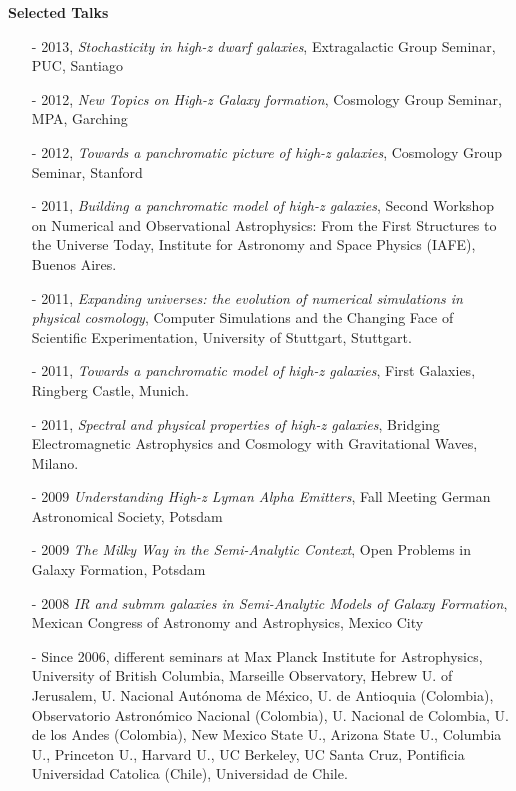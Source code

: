 \documentclass[9pt]{article}
\begin{document}
{\bf Selected Talks}
\begin{itemize} 
\item [-] 2013, {\it Stochasticity in high-z dwarf galaxies},
  Extragalactic Group Seminar, PUC, Santiago
\item [-] 2012, {\it New Topics on High-z Galaxy formation}, Cosmology
  Group Seminar, MPA, Garching 
\item [-] 2012, {\it Towards a panchromatic picture of high-z
  galaxies}, Cosmology Group Seminar, Stanford 
\item [-] 2011, {\it Building a panchromatic model of high-z
  galaxies}, Second Workshop on Numerical and Observational
  Astrophysics: From the First Structures to the Universe Today,
  Institute for Astronomy and Space Physics (IAFE), Buenos Aires. 
\item [-] 2011, {\it Expanding universes: the evolution of numerical
  simulations in physical cosmology}, Computer Simulations and the
  Changing Face of Scientific Experimentation, University of
  Stuttgart, Stuttgart. 
\item [-] 2011, {\it Towards a panchromatic model of high-z galaxies}, First
  Galaxies, Ringberg Castle, Munich.  
\item [-] 2011, {\it Spectral and physical properties of high-z galaxies},
  Bridging Electromagnetic Astrophysics and Cosmology with Gravitational
  Waves, Milano.
\item [-] 2009 {\it Understanding High-z Lyman Alpha Emitters}, Fall
  Meeting German Astronomical Society, Potsdam 
\item [-] 2009 {\it The Milky Way in the Semi-Analytic Context}, Open
  Problems in Galaxy Formation, Potsdam 
\item [-] 2008 {\it IR and submm galaxies in Semi-Analytic Models of
  Galaxy Formation}, Mexican Congress of Astronomy and Astrophysics,
  Mexico City 
\item [-] Since 2006, different seminars at Max Planck Institute for
  Astrophysics, University of British Columbia, Marseille Observatory,
  Hebrew U. of Jerusalem, U. Nacional Aut\'onoma de M\'exico, U. de
  Antioquia (Colombia), Observatorio Astron\'omico Nacional
  (Colombia), U. Nacional de Colombia, U. de los Andes (Colombia), New
  Mexico State U., Arizona State U., Columbia U., Princeton U.,
  Harvard U., UC Berkeley, UC Santa Cruz, Pontificia Universidad
  Catolica (Chile), Universidad de Chile. 
\end{itemize}
\end{document}
